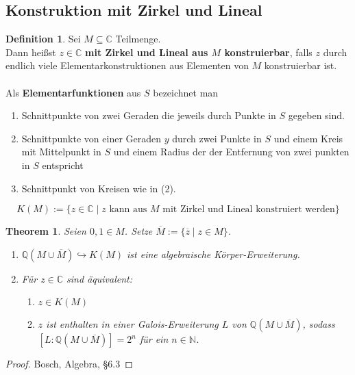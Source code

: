 \documentclass[10pt,a4paper]{article}
\newcommand{\N}{\ensuremath{\mathbb{N}}}
\newcommand{\Q}{\ensuremath{\mathbb{Q}}}
\newcommand{\C}{\ensuremath{\mathbb{C}}}
\newcommand{\ol}[1]{\overline{#1}}
\newcounter{thm}[section]
\theoremstyle{definition}
\newtheorem{definition}[thm]{Definition}
\theoremstyle{plain}
\newtheorem{theorem}[thm]{Theorem}
\theoremstyle{remark}
\begin{document}
\subsection{Konstruktion mit Zirkel und Lineal}
\begin{definition}
	Sei $M\subseteq \C$ Teilmenge.\\
	Dann heißst $z\in\C$ \textbf{mit Zirkel und Lineal aus $M$ konstruierbar}, falls $z$ durch endlich viele Elementarkonstruktionen aus Elementen von $M$ konstruierbar ist.\\
	\\
	Als \textbf{Elementarfunktionen} aus $S$ bezeichnet man
	\begin{enumerate}
		\item Schnittpunkte von zwei Geraden die jeweils durch Punkte in $S$ gegeben sind.
		\item Schnittpunkte von einer Geraden $y$ durch zwei Punkte in $S$ und einem Kreis mit Mittelpunkt in $S$ und einem Radius der der Entfernung von zwei punkten in $S$ entspricht
		\item Schnittpunkt von Kreisen wie in (2).
	\end{enumerate}
	\[K(M):=\{z\in\C\mid \text{$z$ kann aus $M$ mit Zirkel und Lineal konstruiert werden}\}\]
\end{definition}

\begin{theorem}\label{1114thm}
	Seien $0,1\in M$. Setze $\ol M:=\{\ol z\mid z\in M\}$.
	\begin{enumerate}
		\item $\Q(M\cup \ol M)\hookrightarrow K(M)$ ist eine algebraische Körper-Erweiterung.
		\item Für $z\in\C$ sind äquivalent:
		\begin{enumerate}
			\item $z\in K(M)$
			\item $z$ ist enthalten in einer Galois-Erweiterung $L$ von $\Q(M\cup \ol M)$, sodass $[L:\Q(M\cup\ol M)]=2^n$ für ein $n\in\N$.
		\end{enumerate}
	\end{enumerate}
\end{theorem}
\begin{proof}
	Bosch, Algebra, §6.3
\end{proof}
\end{document}
